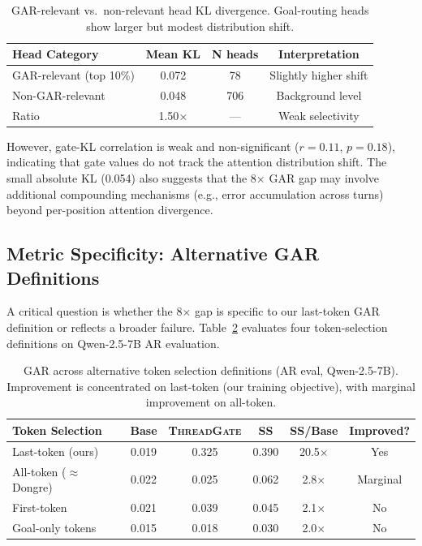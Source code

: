 \documentclass[11pt]{article}
\newcommand{\gar}{\textsc{GAR}}
\newcommand{\tg}{\textsc{ThreadGate}}
\renewcommand{\ss}{\textsc{SS}}
\begin{document}
\begin{table}[t]
\centering
\small
\caption{\gar{}-relevant vs.\ non-relevant head KL divergence. Goal-routing heads show larger but modest distribution shift.}
\label{tab:kl_heads}
\begin{tabular}{lccc}
\toprule
\textbf{Head Category} & \textbf{Mean KL} & \textbf{N heads} & \textbf{Interpretation} \\
\midrule
\gar{}-relevant (top 10\%) & 0.072 & 78 & Slightly higher shift \\
Non-\gar{}-relevant & 0.048 & 706 & Background level \\
Ratio & 1.50$\times$ & --- & Weak selectivity \\
\bottomrule
\end{tabular}
\end{table}

However, gate-KL correlation is weak and non-significant ($r=0.11$, $p=0.18$), indicating that gate values do not track the attention distribution shift. The small absolute KL (0.054) also suggests that the 8$\times$ \gar{} gap may involve additional compounding mechanisms (e.g., error accumulation across turns) beyond per-position attention divergence.

\subsection{Metric Specificity: Alternative \gar{} Definitions}
\label{sec:alt_gar}

A critical question is whether the 8$\times$ gap is specific to our last-token \gar{} definition or reflects a broader failure. Table~\ref{tab:alt_gar} evaluates four token-selection definitions on Qwen-2.5-7B AR evaluation.

\begin{table}[t]
\centering
\small
\caption{\gar{} across alternative token selection definitions (AR eval, Qwen-2.5-7B). Improvement is concentrated on last-token (our training objective), with marginal improvement on all-token.}
\label{tab:alt_gar}
\begin{tabular}{lccccc}
\toprule
\textbf{Token Selection} & \textbf{Base} & \textbf{\tg{}} & \textbf{\ss{}} & \textbf{SS/Base} & \textbf{Improved?} \\
\midrule
Last-token (ours) & 0.019 & 0.325 & 0.390 & 20.5$\times$ & Yes \\
All-token ($\approx$Dongre) & 0.022 & 0.025 & 0.062 & 2.8$\times$ & Marginal \\
First-token & 0.021 & 0.039 & 0.045 & 2.1$\times$ & No \\
Goal-only tokens & 0.015 & 0.018 & 0.030 & 2.0$\times$ & No \\
\bottomrule
\end{tabular}
\end{table}
\end{document}
